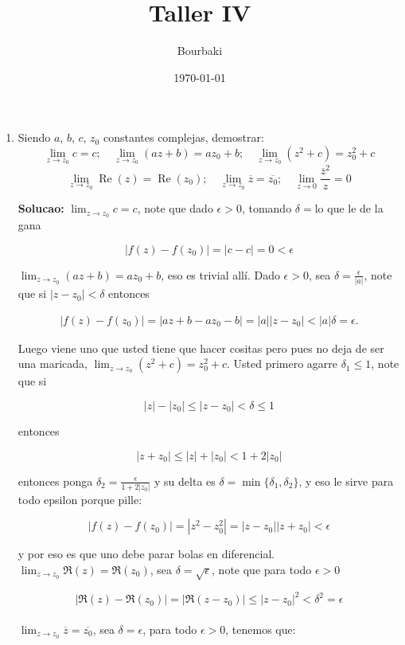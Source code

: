 \documentclass[11pt]{article}
\title{Taller IV}
\author{Bourbaki}
\date{\today}
\begin{document}
\maketitle

\begin{enumerate}
    \item Siendo $a$, $b$, $c$, $z_0$ constantes complejas, demostrar:
    \[
    \lim_{z \to z_0} c = c; \quad \lim_{z \to z_0} (a z + b) = a z_0 + b; \quad \lim_{z \to z_0} (z^2 + c) = z_0^2 + c
    \]
    \[
    \lim_{z \to z_0} \operatorname{Re}(z) = \operatorname{Re}(z_0); \quad \lim_{z \to z_0} \overline{z} = \overline{z_0}; \quad \lim_{z \to 0} \frac{\overline{z}^2}{z} = 0
    \]

\textbf{Solucao:} $\lim_{z \to z_0} c = c$, note que dado $\epsilon>0$, tomando $\delta=$lo que le de la gana

$$|f(z)-f(z_0)|=|c-c|=0<\epsilon$$

$\lim_{z\to z_0}(az+b)=az_0+b$, eso es trivial allí. Dado $\epsilon>0$, sea $\delta=\frac{\epsilon}{|a|}$, note que si $|z-z_0|<\delta$ entonces

\begin{align*}
  |f(z)-f(z_0)|=|az+b-az_0-b|=|a||z-z_0|<|a|\delta=\epsilon
.\end{align*}

Luego viene uno que usted tiene que hacer cositas pero pues no deja de ser una maricada, $\lim_{z\to z_0}(z^2+c)=z_0^2+c$. Usted primero agarre $\delta_1\leq 1$, note que si

$$|z|-|z_0|\leq|z-z_0|<\delta\leq1$$

entonces 

$$|z+z_0|\leq|z|+|z_0|<1+2|z_0|$$

entonces ponga $\delta_2=\frac{\epsilon}{1+2|z_0|}$ y su delta es $\delta=\min\{\delta_1,\delta_2\}$, y eso le sirve para todo epsilon porque pille:

$$|f(z)-f(z_0)|=|z^2-z_0^2|=|z-z_0||z+z_0|<\epsilon$$

y por eso es que uno debe parar bolas en diferencial.\\

$\lim_{z\to z_0}\Re(z)=\Re(z_0)$, sea $\delta=\sqrt{\epsilon}$, note que para todo $\epsilon>0$

$$|\Re(z)-\Re(z_0)|=|\Re(z-z_0)|\leq|z-z_0|^2<\delta^2=\epsilon$$\\

$\lim_{z \to z_0} \overline{z}=\overline{z_0}$, sea $\delta=\epsilon$, para todo $\epsilon>0$, tenemos que:


\end{enumerate}
\end{document}
